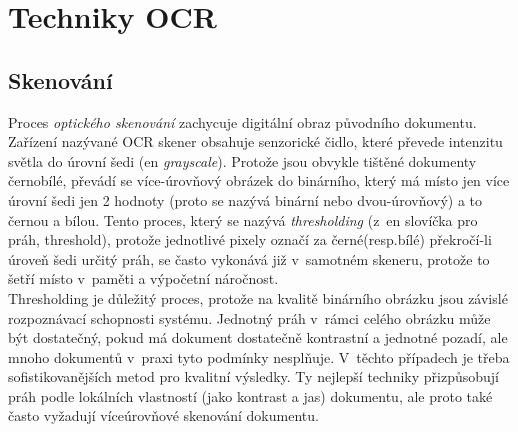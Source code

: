 \documentclass[12pt]{report}			%
\begin{document}
	\section{Techniky \gls{OCR}}
	\label{sec:OCR-techniky}	
	\subsection{Skenování}
	\label{sec:scan}
	Proces \emph{optického skenování} zachycuje digitální obraz původního dokumentu. Zařízení nazývané OCR skener obsahuje senzorické čidlo, které převede intenzitu světla do úrovní šedi (\gls{en} \emph{grayscale}). Protože jsou obvykle tištěné dokumenty černobílé, převádí se více-úrovňový obrázek do binárního, který má místo jen více úrovní šedi jen 2 hodnoty (proto se nazývá binární nebo dvou-úrovňový) a to černou a bílou. Tento proces, který se nazývá \emph{thresholding} (z~\gls{en} slovíčka pro práh, threshold), protože jednotlivé pixely označí za černé(resp.bílé) překročí-li úroveň šedi určitý práh, se často vykonává již v~samotném skeneru, protože to šetří místo v~paměti a výpočetní náročnost. \parencite[\gls{str} 12]{eikvil-ocr} \\
	Thresholding je důležitý proces, protože na kvalitě binárního obrázku jsou závislé rozpoznávací schopnosti systému. Jednotný práh v~rámci celého obrázku může být dostatečný, pokud má dokument dostatečně kontrastní a jednotné pozadí, ale mnoho dokumentů v~praxi tyto podmínky nesplňuje. V~těchto případech je třeba sofistikovanějších metod pro kvalitní výsledky. Ty nejlepší techniky přizpůsobují práh podle lokálních vlastností (jako kontrast a jas) dokumentu, ale proto také často vyžadují víceúrovňové skenování dokumentu. \parencite[\gls{str} 16-17]{chaudhuri2017optical}
\end{document}
